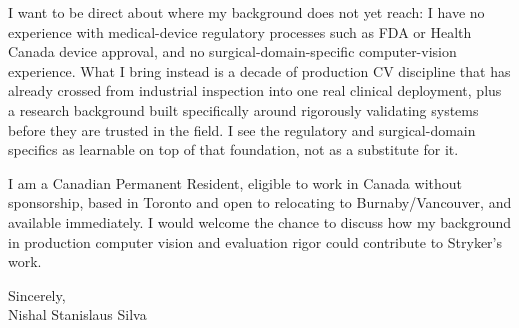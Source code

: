 \documentclass[11pt]{article}
\begin{document}
\vspace{0.5em}

\noindent I want to be direct about where my background does not yet reach: I have no experience with medical-device regulatory processes such as FDA or Health Canada device approval, and no surgical-domain-specific computer-vision experience. What I bring instead is a decade of production CV discipline that has already crossed from industrial inspection into one real clinical deployment, plus a research background built specifically around rigorously validating systems before they are trusted in the field. I see the regulatory and surgical-domain specifics as learnable on top of that foundation, not as a substitute for it.

\vspace{0.5em}

\noindent I am a Canadian Permanent Resident, eligible to work in Canada without sponsorship, based in Toronto and open to relocating to Burnaby/Vancouver, and available immediately. I would welcome the chance to discuss how my background in production computer vision and evaluation rigor could contribute to Stryker's work.

\vspace{1em}

\noindent Sincerely, \\
Nishal Stanislaus Silva
\end{document}
